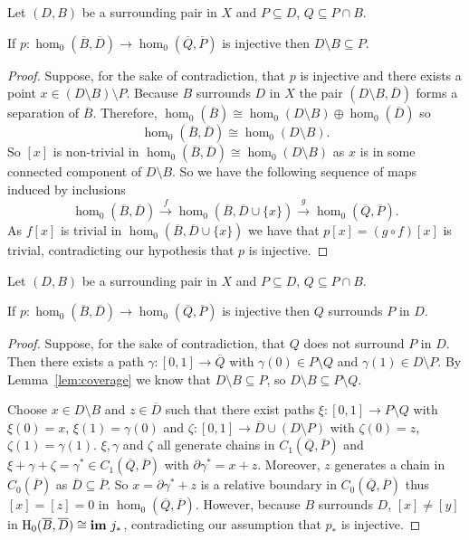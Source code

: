 \begin{lemma}\label{lem:coverage}
  Let $(D, B)$ be a surrounding pair in $X$ and $P\subseteq D$, $Q\subseteq P\cap B$.

  If $p: \hom_0(\overline{B}, \overline{D})\to \hom_0(\overline{Q}, \overline{P})$ is injective then $D\setminus B\subseteq P$.
\end{lemma}
\begin{proof}
    Suppose, for the sake of contradiction, that $p$ is injective and there exists a point $x\in (D\setminus B)\setminus P$.
    Because $B$ surrounds $D$ in $X$ the pair $(D\setminus B, \overline{D})$ forms a separation of $\overline{B}$.
    Therefore, $\hom_0(\overline{B})\cong \hom_0(D\setminus B)\oplus \hom_0(\overline{D})$ so
    \[ \hom_0(\overline{B}, \overline{D})\cong \hom_0(D\setminus B). \]
    So $[x]$ is non-trivial in $\hom_0(\overline{B},\overline{D})\cong \hom_0(D\setminus B)$ as $x$ is in some connected component of $D\setminus B$.
    So we have the following sequence of maps induced by inclusions
    \[ \hom_0(\overline{B},\overline{D})\xrightarrow{f} \hom_0(\overline{B},\overline{D}\cup\{x\})\xrightarrow{g} \hom_0(\overline{Q},\overline{P}).\]
    As $f[x]$ is trivial in $\hom_0(\overline{B},\overline{D}\cup\{x\})$ we have that $p[x] = (g\circ f)[x]$ is trivial, contradicting our hypothesis that $p$ is injective.
\end{proof}

\begin{lemma}\label{lem:coverage}
  Let $(D, B)$ be a surrounding pair in $X$ and $P\subseteq D$, $Q\subseteq P\cap B$.

  If $p: \hom_0(\overline{B}, \overline{D})\to \hom_0(\overline{Q}, \overline{P})$ is injective then $Q$ surrounds $P$ in $D$.
\end{lemma}
\begin{proof}
  Suppose, for the sake of contradiction, that $Q$ does not surround $P$ in $D$.
  Then there exists a path $\gamma : [0,1]\to\overline{Q}$ with $\gamma(0)\in P\setminus Q$ and $\gamma(1)\in D\setminus P$.
  By Lemma~\ref{lem:coverage} we know that $D\setminus B\subseteq P$, so $D\setminus B\subseteq P\setminus Q$.

  Choose $x\in D\setminus B$ and $z\in \overline{D}$ such that there exist paths $\xi : [0,1]\to P\setminus Q$ with $\xi(0) = x$, $\xi(1) = \gamma(0)$ and $\zeta : [0,1]\to \overline{D}\cup (D\setminus P)$ with $\zeta(0) = z$, $\zeta(1) = \gamma(1)$.
  $\xi, \gamma$ and $\zeta$ all generate chains in $C_1(\overline{Q}, \overline{P})$ and $\xi + \gamma + \zeta = \gamma^*\in C_1(\overline{Q}, \overline{P})$ with $\partial\gamma^* = x + z$.
  Moreover, $z$ generates a chain in $C_0(\overline{P})$ as $\overline{D}\subseteq\overline{P}$.
  So $x = \partial\gamma^* + z$ is a relative boundary in $C_0(\overline{Q}, \overline{P})$ thus $[x] = [z] = 0$ in $\hom_0(\overline{Q}, \overline{P})$.
  However, because $B$ surrounds $D$, $[x]\neq [y]$ in $\mathrm{H}_0(\overline{B}, \overline{D})\cong \mathbf{im}~j_*$, contradicting our assumption that $p_*$ is injective.
\end{proof}
